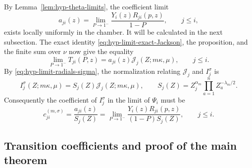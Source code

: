 \documentclass[12pt]{amsart}
\theoremstyle{definition}
\numberwithin{equation}{section}
\theoremstyle{definition}
\let\mc\mathcal
\let\ka\kappa
\let\si\sigma
\let\le\leqslant
\def\beq{\begin{equation}}
\def\eeq{\end{equation}}
\begin{document}
By Lemma~\ref{lem:hyp-theta-limits}, the coefficient limit
\[
 a_{ji}(z)=\lim_{P\to1^-}
             \frac{Y_i(z)R_{ji}(p,z)}{1-P},\qquad j\le i,
\]
exists locally uniformly in the chamber. It will be calculated
in the next subsection. The exact identity
\eqref{eq:hyp-limit-exact-Jackson}, the proposition, and the
finite sum over $\nu$ now give the equality
\beq\label{eq:hyp-limit-jstring}
 \lim_{P\to1^-}T_{ji}(P,z)
 =a_{ji}(z)\mc J_j(Z;m\ka,\mu),\qquad j\le i.
\eeq
By \eqref{eq:hyp-limit-radials-sigma}, the normalization relating
$\mc J_j$ and $I_j^\si$ is
\beq\label{eq:hyp-limit-KZ-factor}
 I_j^\si(Z;m\ka,\mu)=S_j(Z)\mc J_j(Z;m\ka,\mu),
 \qquad
 S_j(Z)=Z_j^{\alpha_m}
 \prod_{a=1}^nZ_a^{-\lambda_m/2}.
\eeq
Consequently the coefficient of $I_j^\si$ in the limit of
$\Psi_i$ must be
\beq\label{eq:hyp-limit-coefficient-ratio}
 c_{ji}^{(m,\si)}=\frac{a_{ji}(z)}{S_j(Z)}
 =\lim_{P\to1^-}
 \frac{Y_i(z)R_{ji}(p,z)}{(1-P)S_j(Z)},
 \qquad j\le i.
\eeq

\subsection{Transition coefficients and proof of the main theorem}
\label{subsec:hyp-limit-coefficients}
\end{document}
